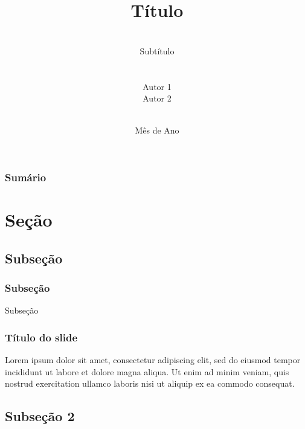\documentclass[11pt, red]{beamer}
\title[Título]{\large{Título} }
\author[Autor 1 \& Autor 2]{
    {\small \textcolor[rgb]{0.00,0.00,0.63}{\textit{ \ }}}\\
    {\color{black} Subtítulo }\\
    \vspace{0.2cm}
    {\small \textcolor[rgb]{0.00,0.00,0.63}{\textit{ \ }}}\\
    {\color{black} \text{} }\\
    {\color{black} Autor 1 }\\
    {\color{black} Autor 2 }\\
    {\color{black} \ }\\
  }
\institute[UFJF]{Universidade Federal de Juiz de Fora}
\date{Mês de Ano}
\newcommand{\verm}{\textcolor[rgb]{1.00,0.00,0.00}}
\begin{document}

\begin{frame}[plain]

    \titlepage
    
\end{frame}


\begin{frame}[allowframebreaks] \frametitle{Sumário}
    \small
    \tableofcontents 
    
\end{frame}

\section[Seção]{Seção}

\subsection[Subseção]{Subseção}

\begin{frame} \frametitle{Subseção}

\begin{center}
    \LARGE{\verm{Subseção}}
\end{center}

\end{frame}

\begin{frame} \frametitle{Título do slide}

    Lorem ipsum dolor sit amet, consectetur adipiscing elit, sed do eiusmod tempor incididunt ut labore et dolore magna aliqua. Ut enim ad minim veniam, quis nostrud exercitation ullamco laboris nisi ut aliquip ex ea commodo consequat.
    \cite{knuth}

\end{frame}

\subsection[Subseção 2]{Subseção 2}
\end{document}
